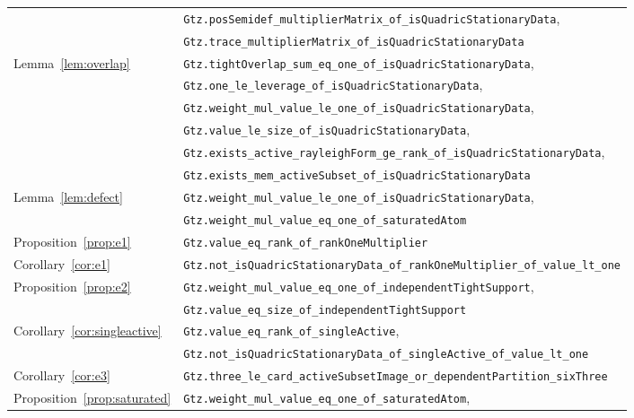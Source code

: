 {\begin{longtable}{@{}ll@{}}
                               & \texttt{Gtz.posSemidef\_multiplierMatrix\_of\_isQuadricStationaryData}, \\
                               & \texttt{Gtz.trace\_multiplierMatrix\_of\_isQuadricStationaryData} \\
Lemma~\ref{lem:overlap}        & \texttt{Gtz.tightOverlap\_sum\_eq\_one\_of\_isQuadricStationaryData}, \\
                               & \texttt{Gtz.one\_le\_leverage\_of\_isQuadricStationaryData}, \\
                               & \texttt{Gtz.weight\_mul\_value\_le\_one\_of\_isQuadricStationaryData}, \\
                               & \texttt{Gtz.value\_le\_size\_of\_isQuadricStationaryData}, \\
                               & \texttt{Gtz.exists\_active\_rayleighForm\_ge\_rank\_of\_isQuadricStationaryData}, \\
                               & \texttt{Gtz.exists\_mem\_activeSubset\_of\_isQuadricStationaryData} \\
Lemma~\ref{lem:defect}         & \texttt{Gtz.weight\_mul\_value\_le\_one\_of\_isQuadricStationaryData}, \\
                               & \texttt{Gtz.weight\_mul\_value\_eq\_one\_of\_saturatedAtom} \\
Proposition~\ref{prop:e1}      & \texttt{Gtz.value\_eq\_rank\_of\_rankOneMultiplier} \\
Corollary~\ref{cor:e1}         & \texttt{Gtz.not\_isQuadricStationaryData\_of\_rankOneMultiplier\_of\_value\_lt\_one} \\
Proposition~\ref{prop:e2}      & \texttt{Gtz.weight\_mul\_value\_eq\_one\_of\_independentTightSupport}, \\
                               & \texttt{Gtz.value\_eq\_size\_of\_independentTightSupport} \\
Corollary~\ref{cor:singleactive}
                               & \texttt{Gtz.value\_eq\_rank\_of\_singleActive}, \\
                               & \texttt{Gtz.not\_isQuadricStationaryData\_of\_singleActive\_of\_value\_lt\_one} \\
Corollary~\ref{cor:e3}         & \texttt{Gtz.three\_le\_card\_activeSubsetImage\_or\_dependentPartition\_sixThree} \\
Proposition~\ref{prop:saturated}& \texttt{Gtz.weight\_mul\_value\_eq\_one\_of\_saturatedAtom}, \\

\end{longtable}}
